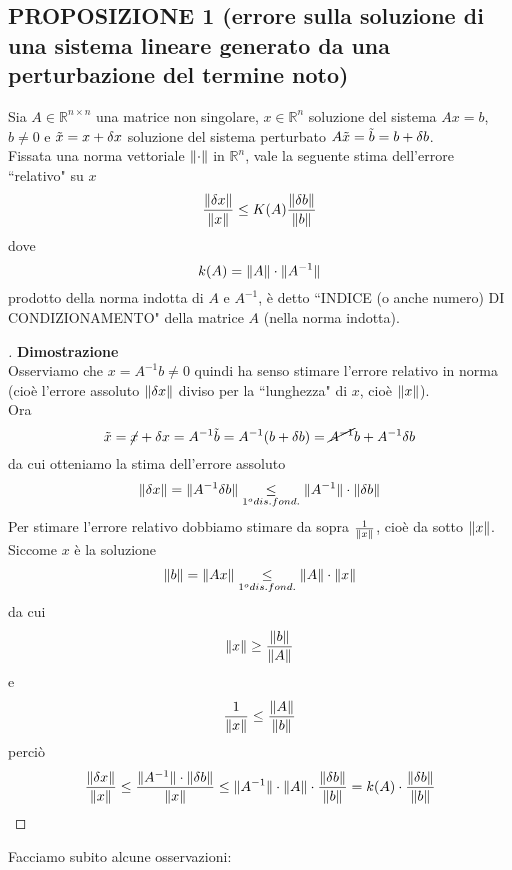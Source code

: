 \subsection{PROPOSIZIONE 1 (errore sulla soluzione di una sistema lineare generato da una perturbazione del termine noto)}
Sia $A \in \mathbb{R}^{n\times n}$ una matrice non singolare, $x \in \mathbb{R}^n$ soluzione del sistema $Ax=b$, $b \neq 0$ e $\Tilde{x}=x+\delta x$ soluzione del sistema perturbato $A\Tilde{x}=\Tilde{b}=b+\delta b$.\\
Fissata una norma vettoriale $\lVert\cdot\rVert$ in $\mathbb{R}^n$, vale la seguente stima dell'errore ``relativo" su $x$
\begin{equation*}
    \frac{\lVert\delta x\rVert}{\lVert x\rVert} \leq K(A) \frac{\lVert\delta b\rVert}{\lVert b\rVert}
\end{equation*}
dove 
\begin{equation*}
    k(A)=\lVert A\rVert\cdot\lVert A^{-1}\rVert
\end{equation*}
prodotto della norma indotta di $A$ e $A^{-1}$, è detto ``INDICE (o anche numero) DI CONDIZIONAMENTO" della matrice $A$ (nella norma indotta).\\
\begin{proof}[\unskip\nopunct]
\textbf{Dimostrazione}\\Osserviamo che $x=A^{-1}b\neq0$ quindi ha senso stimare l'errore relativo in norma (cioè l'errore assoluto $\lVert\delta x\rVert$ diviso per la ``lunghezza" di $x$, cioè $\lVert x\rVert$). \\Ora
\begin{equation*}
    \tilde{x}=\cancel{x}+\delta x =A^{-1}\tilde{b}=A^{-1}(b+\delta b)=\cancel{A^{-1}}b+A^{-1}\delta b
\end{equation*}
da cui otteniamo la stima dell'errore assoluto
\begin{equation*}
    \lVert\delta x\rVert=\lVert A^{-1}\delta b\rVert\underset{1^o dis. fond.}{\leq}\lVert A^{-1}\rVert\cdot\lVert\delta b\rVert
\end{equation*}
Per stimare l'errore relativo dobbiamo stimare da sopra $\frac{1}{\lVert x\rVert}$, cioè da sotto $\lVert x\rVert$.\\Siccome $x$ è la soluzione 
\begin{equation*}
    \lVert b\rVert=\lVert Ax\rVert\underset{1^o dis. fond.}{\leq}\lVert A\rVert\cdot\lVert x\rVert
\end{equation*}
da cui
\begin{equation*}
    \lVert x\rVert\geq\frac{\lVert b\rVert}{\lVert A\rVert}
\end{equation*}
e
\begin{equation*}
    \frac{1}{\lVert x\rVert} \le \frac{\lVert A\rVert}{\lVert b\rVert}
\end{equation*}
perciò
\begin{equation*}
    \frac{\lVert\delta x\rVert}{\lVert x\rVert}\leq \frac{\lVert A^{-1}\rVert\cdot\lVert\delta b\rVert}{\lVert x\rVert}\leq \lVert A^{-1}\rVert\cdot\lVert A\rVert\cdot\frac{\lVert\delta b\rVert}{\lVert b\rVert}=k(A)\cdot\frac{\lVert\delta b\rVert}{\lVert b\rVert}
\end{equation*}
\end{proof}
Facciamo subito alcune osservazioni:


